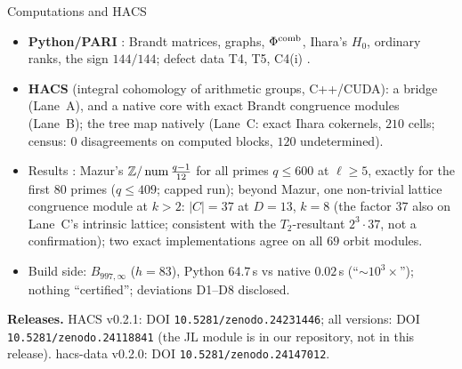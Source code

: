 \begin{frame}{Computations and HACS}
  \small
  \begin{itemize}\setlength{\itemsep}{0pt}
    \item \textbf{Python/PARI} : Brandt matrices, graphs, $\Phi^{\mathrm{comb}}$, Ihara's $H_0$, ordinary ranks, the sign $144/144$; defect data T4, T5, C4(i) .
    \item \textbf{HACS} (integral cohomology of arithmetic groups, C++/CUDA): a bridge (Lane~A), and a native
      core with exact Brandt congruence modules (Lane~B); the tree map natively (Lane~C: exact Ihara cokernels, $210$ cells; census: $0$ disagreements on computed blocks, $120$ undetermined).
    \item Results : Mazur's $\mathbb{Z}/\operatorname{num}\frac{q-1}{12}$ for all primes $q\le600$ at $\ell\ge5$, exactly for the first $80$ primes ($q\le409$; capped run);
      beyond Mazur, one non-trivial lattice congruence module at $k>2$: $|C|=37$ at $D=13$, $k=8$ (the factor $37$ also on Lane~C's intrinsic lattice; consistent with the
      $T_2$-resultant $2^3\cdot37$, not a confirmation); two exact implementations agree on all $69$ orbit modules.
    \item Build side: $B_{997,\infty}$ ($h=83$), Python $64.7$\,s vs native $0.02$\,s (``$\sim10^3\times$''); nothing ``certified''; deviations D1--D8 disclosed.
  \end{itemize}
  \smallskip
  {\footnotesize\textbf{Releases.} HACS v0.2.1: DOI \texttt{10.5281/zenodo.24231446}; all versions: DOI \texttt{10.5281/zenodo.24118841}
  (the JL module is in our repository, not in this release). hacs-data v0.2.0: DOI \texttt{10.5281/zenodo.24147012}.}
\end{frame}
